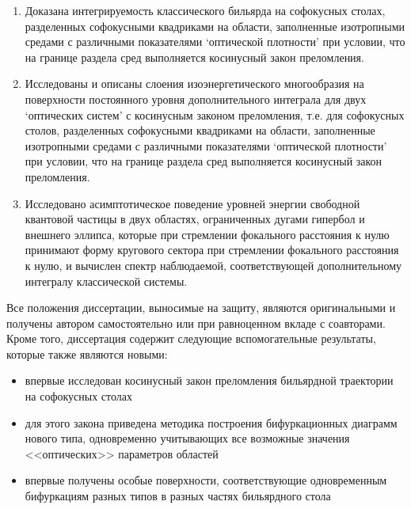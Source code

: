 {}
\begin{enumerate}[beginpenalty=10000] %
  \item Доказана интегрируемость классического бильярда на софокусных столах, разделенных софокусными квадриками на области, заполненные изотропными средами с различными показателями `оптической плотности' при условии, что на границе раздела сред выполняется косинусный закон преломления.
 \item Исследованы и описаны слоения изоэнергетического многообразия на поверхности постоянного уровня дополнительного интеграла для двух `оптических систем' с косинусным законом преломления, т.е. для софокусных столов, разделенных софокусными квадриками на области, заполненные изотропными средами с различными показателями `оптической плотности'  при условии, что на границе раздела сред выполняется косинусный закон преломления.
   \item Исследовано асимптотическое поведение уровней энергии свободной квантовой частицы в двух областях, ограниченных дугами гипербол и внешнего эллипса, которые при стремлении фокального расстояния к нулю принимают форму кругового сектора при стремлении фокального расстояния к нулю, и вычислен спектр наблюдаемой, соответствующей дополнительному интегралу классической системы.

\end{enumerate}


{\novelty} 
Все положения диссертации, выносимые на защиту, являются оригинальными и получены автором самостоятельно  или при равноценном вкладе с соавторами. Кроме того, диссертация содержит следующие вспомогательные результаты, которые также являются новыми:
  \begin{itemize}[beginpenalty=10000] %
  \item впервые исследован косинусный закон преломления бильярдной траектории на софокусных столах
  \item для этого закона приведена методика построения бифуркационных диаграмм нового типа, одновременно учитывающих все возможные значения <<оптических>> параметров областей
  \item впервые получены особые поверхности, соответствующие одновременным бифуркациям разных типов в разных частях бильярдного стола
  \end{itemize}


